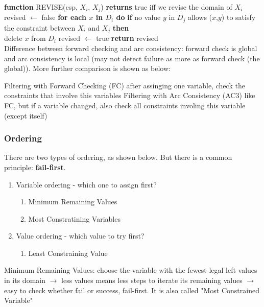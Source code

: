 \tabto{0mm} \textbf{function} REVISE(csp, $X_{i}$, $X_{j}$) \textbf{returns} true iff we revise the domain of $X_{i}$
\tabto{5mm} revised $\leftarrow$ false
\tabto{5mm} \textbf{for each $x$ in $D_{i}$ do}
\tabto{10mm} \textbf{if} no value $y$ in $D_{j}$ allows ($x$,$y$) to satisfy the constraint between $X_{i}$ and $X_{j}$ \textbf{then} \\
\tabto{15mm} delete $x$ from $D_{i}$
\tabto{15mm} revised $\leftarrow$ true
\tabto{5mm} \textbf{return} revised \\

\noindent
Difference between forward checking and arc consistency: forward check is global and arc consistency is local (may not detect failure as more as forward check (the global)). More further comparison is shown as below: 
\begin{outline}
    \1 Filtering with Forward Checking (FC)
        \2 after assinging one variable, check the constraints that involve this variables
    \1 Filtering with Arc Consistency (AC3)
        \2 like FC, but if a variable changed, also check all constraints involing this variable (except itself)
\end{outline}

\subsubsection{Ordering}
There are two types of ordering, as shown below. But there is a common principle: \textbf{fail-first}.
\begin{enumerate}
    \item Variable ordering - which one to assign first?
    \begin{enumerate}
        \item Minimum Remaining Values
        \item Most Constratining Variables
    \end{enumerate}
    \item Value ordering - which value to try first?
    \begin{enumerate}
        \item Least Constraining Value
    \end{enumerate}
\end{enumerate}

\noindent
Minimum Remaining Values: choose the variable with the fewest legal left values in its domain $\rightarrow$ less values means less steps to iterate its remaining values $\rightarrow$ easy to check whether fail or success, fail-first. It is also called "Most Constrained Variable" \\

